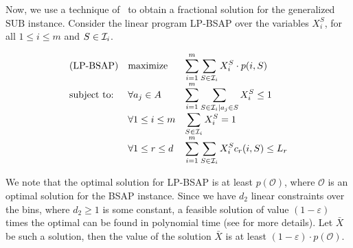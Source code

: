 \documentclass[11pt]{article}
\newcommand{\eps}{\varepsilon}
\newcommand{\bX}{\bar{X}}
\newcommand{\cI}{{\cal I}}
\newcommand{\mO}{\mathcal{O}}
\newcommand{\SUB}{\mbox{SUB}}
\begin{document}
{Now, we use a technique of~\cite{fgms06} to obtain a fractional solution
 for the generalized ${\SUB}$ instance. Consider the linear program
LP-BSAP over the variables $X_i^{S}$, for all $1\leq i\leq m$ and $S\in \cI_i$.
\begin{figure}
\begin{center}
\[
\begin{array}{llll}
\mbox{(LP-BSAP)}& \mbox{maximize} &
 \displaystyle{\sum_{i=1}^{m}  \sum_{S \in  \cI_i}  X_i^{S} \cdot p(i,S) } \\
 \mbox{subject to:}
  & \forall a_j\in A  & \displaystyle{\sum_{i=1}^{m} \sum_{S\in \cI_i| a_j \in S  } X_i^{S} \leq 1}\\
  &\forall 1\leq i \leq m &\displaystyle{ \sum_{S \in \cI_i} X_i^{S} = 1 } \\
  &\forall 1\leq r \leq d &\displaystyle{ \sum_{i=1}^{m} \sum_{S \in \cI_i} X_i^{S} c_r(i,S) \leq L_r }
\end{array}
\]
\end{center}
\end{figure}
We note that the optimal solution for LP-BSAP is at
least $p(\mO)$, where $\mO$ is an optimal solution for the BSAP
instance.
Since we have $d_2$ linear constraints over the bins, where $d_2 \geq 1$ is some constant,
a feasible solution of value $(1-\eps)$ times the optimal can be found in polynomial time (see \cite{fgms06} for more details). Let $\bX$ be
such a solution, then the value of the solution $\bX$ is at least $(1-\eps) \cdot p(\mO)$.

}
\end{document}
